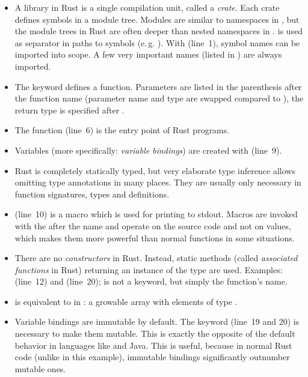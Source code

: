 \vspace{-3mm}
\begin{itemize}
  \item A library in Rust is a single compilation unit, called a \emph{crate}.
  Each crate defines symbols in a module tree.
  Modules are similar to namespaces in \cpp, but the module trees in Rust are often deeper than nested namespaces in \cpp.
  \code{::} is used as separator in paths to symbols (e.\,g. ).
  With  (line~1), symbol names can be imported into scope.
  A few very important names (listed in ) are always imported.
  \item The keyword  defines a function.
  Parameters are listed in the parenthesis after the function name (parameter name and type are swapped compared to \cpp), the return type is specified after \code{->}.
  \item The  function (line~6) is the entry point of Rust programs.
  \item Variables (more specifically: \emph{variable bindings}) are created with  (line~9).
  \item Rust is completely statically typed, but very elaborate type inference allows omitting type annotations in many places.
  They are usually only necessary in function signatures, types and  definitions.
  \item {} (line~10) is a macro which is used for printing to stdout.
  Macros are invoked with the \code{!} after the name and operate on the source code and not on values, which makes them more powerful than normal functions in some situations.
  \item There are no \emph{constructors} in Rust.
  Instead, static methods (called \emph{associated functions} in Rust) returning an instance of the type are used.
  Examples:  (line~12) and   (line~20);  is not a keyword, but simply the function's name.
  \item {} is equivalent to  in \cpp: a growable array with elements of type .
  \item Variable bindings are immutable by default.
  The keyword  (line~19 and 20) is necessary to make them mutable.
  This is exactly the opposite of the default behavior in languages like \cpp and Java.
  This is useful, because in normal Rust code (unlike in this example), immutable bindings significantly outnumber mutable ones.

\end{itemize}
